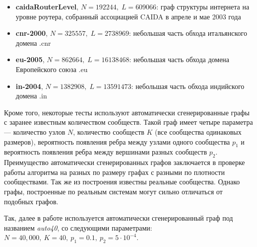 \begin{itemize}
	\item \textbf{caidaRouterLevel}, $N = 192244,\;L =  609066$: граф структуры интернета на уровне роутера, собранный ассоциацией CAIDA в апреле и мае 2003 года
	\item \textbf{cnr-2000}, $N = 325557,\;L = 2738969$: небольшая часть обхода итальянского домена .cnr \cite{Boldi&Vigna:2004, Boldi&al:2011, Boldi&al:2004}
	\item \textbf{eu-2005}, $N = 862664,\;L = 16138468$: небольшая часть обхода домена Европейского союза .eu \cite{Boldi&Vigna:2004, Boldi&al:2011, Boldi&al:2004}
	\item \textbf{in-2004}, $N = 1382908,\;L = 13591473$: небольшая часть обхода индийского домена .in \cite{Boldi&Vigna:2004, Boldi&al:2011, Boldi&al:2004}

\end{itemize}

Кроме того, некоторые тесты используют автоматически сгенерированные графы с заранее известным количеством сообществ. Такой граф имеет четыре параметра --- количество узлов $N$, количество сообществ $K$ (все сообщества одинаковых размеров), вероятность появления ребра между узлами одного сообщества $p_1$ и вероятность появления ребра между вершинами разных сообществ $p_2$. Преимущество автоматически сгенерированных графов заключается в проверке работы алгоритма на разных по размеру графах с разными по плотности сообществами. Так же из построения известны реальные сообщества. Однако графы, построенные по реальным системам могут сильно отличаться от подобных графов.

Так, далее в работе используется автоматически сгенерированный граф под названием \emph{auto40}, со следующими параметрами: $N = 40,000,\ K = 40,\ p_1 = 0.1,\ p_2 = 5\cdot 10^{-4}$.